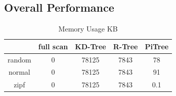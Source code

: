 \documentclass[sigconf,10pt]{acmart}
\begin{document}
\subsection{Overall Performance}

\begin{table}[h]
  \centering
  \begin{tabular}{|c|c|c|c|c|}
    \hline
          & full scan & KD-Tree & R-Tree & PiTree \\
    \hline
    random & 0 & 78125 & 7843 & 78 \\
    \hline
    normal & 0 & 78125 & 7843 & 91 \\
    \hline
    zipf & 0 & 78125 & 7843 & 0.1 \\
    \hline 
  \end{tabular}
  \caption{Memory Usage KB}
  \label{table:mem}
\end{table}
\end{document}
